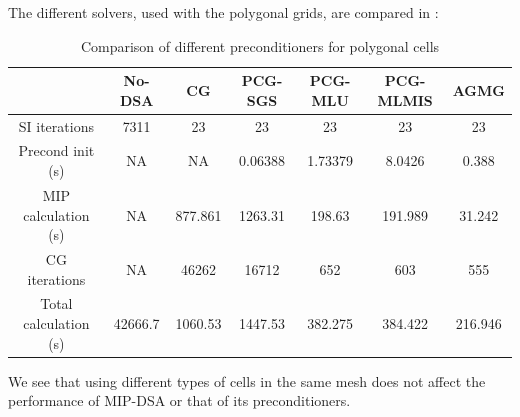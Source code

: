 The different solvers, used with the polygonal grids, are compared in
:
\begin{table}[H]
  \begin{center}
    \caption{Comparison of different preconditioners for polygonal cells}
    \begin{tabular}{|c|c|c|c|c|c|c|}
      \hline
      & No-DSA & CG & PCG-SGS & PCG-MLU & PCG-MLMIS & AGMG \\
      \hline
      SI iterations   & 7311    & 23      & 23      & 23      & 23      & 23 \\
   Precond init (s)   & NA      & NA      & 0.06388 & 1.73379 & 8.0426  & 0.388 \\
MIP calculation (s)   & NA      & 877.861 & 1263.31 & 198.63  & 191.989 &
      31.242 \\
      CG iterations   & NA      & 46262   & 16712   & 652     & 603     & 555 \\
Total calculation (s) & 42666.7 & 1060.53 & 1447.53 & 382.275 & 384.422 &
      216.946 \\
      \hline
    \end{tabular}
    \label{comparison_homog_poly}
  \end{center}
\end{table}
We see that using different types of cells in the same mesh does not affect
the performance of MIP-DSA or that of its preconditioners.

